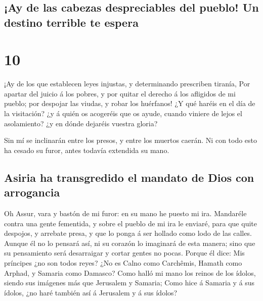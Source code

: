 \hypertarget{ay-de-las-cabezas-despreciables-del-pueblo-un-destino-terrible-te-espera}{%
\subsection{¡Ay de las cabezas despreciables del pueblo! Un destino
terrible te
espera}\label{ay-de-las-cabezas-despreciables-del-pueblo-un-destino-terrible-te-espera}}

\hypertarget{section-23-10}{%
\section{10}\label{section-23-10}}

 ¡Ay de los que establecen leyes injustas, y determinando
prescriben tiranía,  Por apartar del juicio á los pobres,
y por quitar el derecho á los afligidos de mi pueblo; por despojar las
viudas, y robar los huérfanos!  ¿Y qué haréis en el día de
la visitación? ¿y á quién os acogeréis que os ayude, cuando viniere de
lejos el asolamiento? ¿y en dónde dejaréis vuestra gloria?

 Sin mí se inclinarán entre los presos, y entre los
muertos caerán. Ni con todo esto ha cesado su furor, antes todavía
extendida su mano.

\hypertarget{asiria-ha-transgredido-el-mandato-de-dios-con-arrogancia}{%
\subsection{Asiria ha transgredido el mandato de Dios con
arrogancia}\label{asiria-ha-transgredido-el-mandato-de-dios-con-arrogancia}}

 Oh Assur, vara y bastón de mi furor: en su mano he puesto
mi ira.  Mandaréle contra una gente fementida, y sobre el
pueblo de mi ira le enviaré, para que quite despojos, y arrebate presa,
y que lo ponga á ser hollado como lodo de las calles. 
Aunque él no lo pensará así, ni su corazón lo imaginará de esta manera;
sino que su pensamiento será desarraigar y cortar gentes no pocas.
 Porque él dice: Mis príncipes ¿no son todos reyes?
 ¿No es Calno como Carchêmis, Hamath como Arphad, y
Samaria como Damasco?  Como halló mi mano los reinos de
los ídolos, siendo sus imágenes más que Jerusalem y Samaria;
 Como hice á Samaria y á sus ídolos, ¿no haré también así
á Jerusalem y á sus ídolos?

